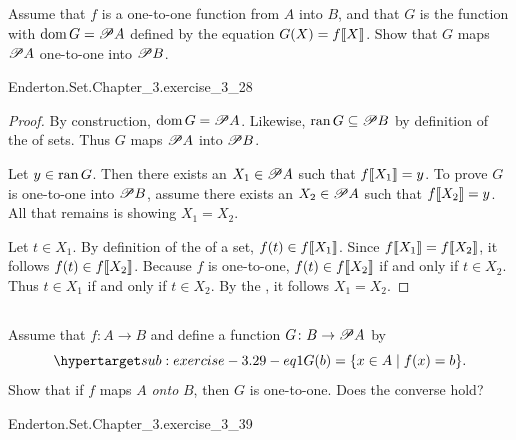 \documentclass{report}
\begin{document}
\subsection{}%

  Assume that $f$ is a one-to-one function from $A$ into $B$, and that $G$ is
    the function with $\mathop{\text{dom}}{G} = \mathscr{P}A$ defined by the equation
    $G(X) = f\!\left\llbracket X\right\rrbracket$.
  Show that $G$ maps $\mathscr{P}A$ one-to-one into $\mathscr{P}B$.

    {Enderton.Set.Chapter\_3.exercise\_3\_28}

  \begin{proof}
    By construction, $\mathop{\text{dom}}{G} = \mathscr{P}A$.
    Likewise, $\mathop{\text{ran}}{G} \subseteq \mathscr{P}B$ by definition of the
       of sets.
    Thus $G$ maps $\mathscr{P}A$ into $\mathscr{P}B$.

    Let $y \in \mathop{\text{ran}}{G}$.
    Then there exists an $X_1 \in \mathscr{P}A$ such that $f\!\left\llbracket X_1\right\rrbracket = y$.
    To prove $G$ is one-to-one into $\mathscr{P}B$, assume there exists an
      $X_2 \in \mathscr{P}A$ such that $f\!\left\llbracket X_2\right\rrbracket = y$.
    All that remains is showing $X_1 = X_2$.

    Let $t \in X_1$.
    By definition of the  of a set, $f(t) \in f\!\left\llbracket X_1\right\rrbracket$.
    Since $f\!\left\llbracket X_1\right\rrbracket = f\!\left\llbracket X_2\right\rrbracket$, it follows $f(t) \in f\!\left\llbracket X_2\right\rrbracket$.
    Because $f$ is one-to-one, $f(t) \in f\!\left\llbracket X_2\right\rrbracket$ if and only if
      $t \in X_2$.
    Thus $t \in X_1$ if and only if $t \in X_2$.
    By the , it follows $X_1 = X_2$.
  \end{proof}

\subsection{}%

  Assume that $f \colon A \rightarrow B$ and define a function
    $G \colon B \rightarrow \mathscr{P}A$ by
    \begin{equation}
      \hyperlabel{sub:exercise-3.29-eq1}
      G(b) = \{x \in A \mid f(x) = b\}.
    \end{equation}
  Show that if $f$ maps $A$ \textit{onto} $B$, then $G$ is one-to-one.
  Does the converse hold?

    {Enderton.Set.Chapter\_3.exercise\_3\_39}
\end{document}

